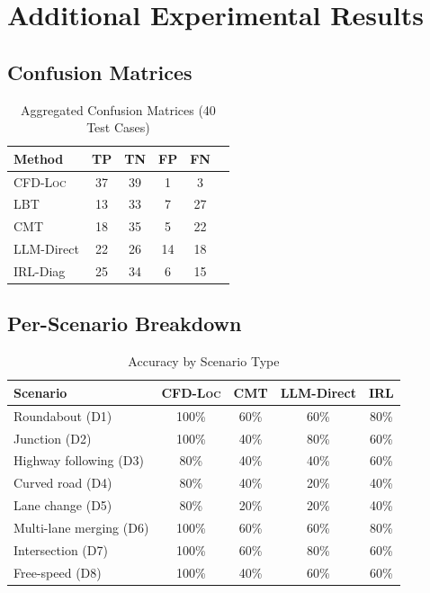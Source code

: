 \documentclass[journal]{IEEEtran}
\theoremstyle{plain}
\theoremstyle{definition}
\theoremstyle{remark}
\newcommand{\methodname}{\textsc{CFD-Loc}}
\begin{document}
\section{Additional Experimental Results}

\subsection{Confusion Matrices}

\begin{table}[h]
\centering
\caption{Aggregated Confusion Matrices (40 Test Cases)}
\label{tab:confusion}
\small
\begin{tabular}{lccccc}
\toprule
\textbf{Method} & \textbf{TP} & \textbf{TN} & \textbf{FP} & \textbf{FN} \\\midrule
\methodname & 37 & 39 & 1 & 3 \\
LBT & 13 & 33 & 7 & 27 \\
CMT & 18 & 35 & 5 & 22 \\
LLM-Direct & 22 & 26 & 14 & 18 \\
IRL-Diag & 25 & 34 & 6 & 15 \\
\bottomrule
\end{tabular}
\end{table}

\subsection{Per-Scenario Breakdown}

\begin{table}[h]
\centering
\caption{Accuracy by Scenario Type}
\label{tab:per_scenario}
\small
\begin{tabular}{lcccc}
\toprule
\textbf{Scenario} & \textbf{\methodname} & \textbf{CMT} & \textbf{LLM-Direct} & \textbf{IRL} \\\midrule
Roundabout (D1) & 100\% & 60\% & 60\% & 80\%\\
Junction (D2) & 100\% & 40\% & 80\% & 60\%\\
Highway following (D3) & 80\% & 40\% & 40\% & 60\%\\
Curved road (D4) & 80\% & 40\% & 20\% & 40\%\\
Lane change (D5) & 80\% & 20\% & 20\% & 40\%\\
Multi-lane merging (D6) & 100\% & 60\% & 60\% & 80\%\\
Intersection (D7) & 100\% & 60\% & 80\% & 60\%\\
Free-speed (D8) & 100\% & 40\% & 60\% & 60\%\\
\bottomrule
\end{tabular}
\end{table}
\end{document}
